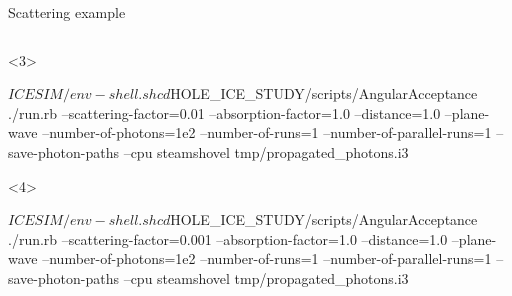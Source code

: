 \begin{frame}[fragile]{Scattering example}
\begin{columns}
\begin{column}{0.5\textwidth}
      \begin{onlyenv}<3>
        \begin{smallbash}
          $ICESIM/env-shell.sh
          cd $HOLE_ICE_STUDY/scripts/AngularAcceptance
          ./run.rb --scattering-factor=0.01 --absorption-factor=1.0 --distance=1.0 --plane-wave --number-of-photons=1e2 --number-of-runs=1 --number-of-parallel-runs=1 --save-photon-paths --cpu
          steamshovel tmp/propagated_photons.i3
        \end{smallbash}
      \end{onlyenv}

      \begin{onlyenv}<4>
        \begin{smallbash}
          $ICESIM/env-shell.sh
          cd $HOLE_ICE_STUDY/scripts/AngularAcceptance
          ./run.rb --scattering-factor=0.001 --absorption-factor=1.0 --distance=1.0 --plane-wave --number-of-photons=1e2 --number-of-runs=1 --number-of-parallel-runs=1 --save-photon-paths --cpu
          steamshovel tmp/propagated_photons.i3
        \end{smallbash}
      \end{onlyenv}

    \end{column}
  \end{columns}


\end{frame}

